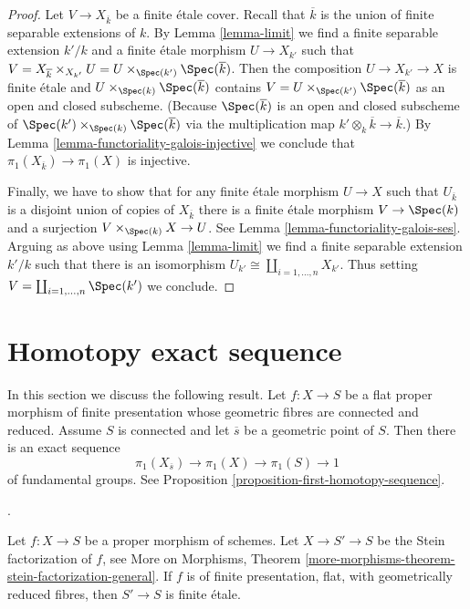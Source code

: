 \begin{proof}
\medskip\noindent
Let $V \to X_{\overline{k}}$ be a finite \'etale cover. Recall that
$\overline{k}$ is the union of finite separable extensions of $k$.
By Lemma \ref{lemma-limit} we find a finite separable extension $k'/k$
and a finite \'etale morphism $U \to X_{k'}$ such that
$V = X_{\overline{k}} \times_{X_{k'}} U =
U \times_{\Spec(k')} \Spec(\overline{k})$.
Then the composition $U \to X_{k'} \to X$ is finite \'etale
and $U \times_{\Spec(k)} \Spec(\overline{k})$
contains $V = U \times_{\Spec(k')} \Spec(\overline{k})$
as an open and closed subscheme. (Because $\Spec(\overline{k})$
is an open and closed subscheme of
$\Spec(k') \times_{\Spec(k)} \Spec(\overline{k})$ via
the multiplication map $k' \otimes_k \overline{k} \to \overline{k}$.) By
Lemma \ref{lemma-functoriality-galois-injective}
we conclude that $\pi_1(X_{\overline{k}}) \to \pi_1(X)$ is injective.

\medskip\noindent
Finally, we have to show that for any finite \'etale morphism
$U \to X$ such that $U_{\overline{k}}$ is a disjoint union
of copies of $X_{\overline{k}}$ there is a finite \'etale
morphism $V \to \Spec(k)$ and a surjection $V \times_{\Spec(k)} X \to U$.
See Lemma \ref{lemma-functoriality-galois-ses}.
Arguing as above using Lemma \ref{lemma-limit}
we find a finite separable extension $k'/k$
such that there is an isomorphism
$U_{k'} \cong \coprod_{i = 1, \ldots, n} X_{k'}$.
Thus setting $V = \coprod_{i = 1, \ldots, n} \Spec(k')$
we conclude.
\end{proof}






\section{Homotopy exact sequence}
\label{section-homotopy-exact-sequence}

\noindent
In this section we discuss the following result.
Let $f : X \to S$ be a flat proper morphism of
finite presentation whose
geometric fibres are connected and reduced.
Assume $S$ is connected and let $\overline{s}$
be a geometric point of $S$. Then there is an exact
sequence
$$
\pi_1(X_{\overline{s}}) \to \pi_1(X) \to \pi_1(S) \to 1
$$
of fundamental groups. See
Proposition \ref{proposition-first-homotopy-sequence}.

\begin{lemma}
\label{lemma-stein-factorization-etale}
\begin{reference}
\cite[Expose X, Proposition 1.2, p. 262]{SGA1}.
\end{reference}
Let $f : X \to S$ be a proper morphism of schemes.
Let $X \to S' \to S$ be the Stein factorization of $f$, see
More on Morphisms, Theorem
\ref{more-morphisms-theorem-stein-factorization-general}.
If $f$ is of finite presentation, flat, with geometrically
reduced fibres, then $S' \to S$ is finite \'etale.
\end{lemma}

